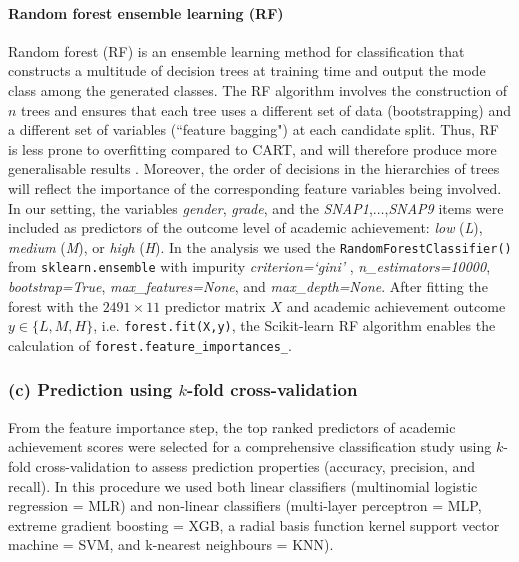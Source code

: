 \documentclass[10pt,letterpaper]{article}
\begin{document}
{{\paragraph{Random forest ensemble learning (RF)}
Random forest (RF) is an ensemble learning method for classification that constructs a multitude of decision trees at training time and output the mode class among 
the generated classes. The RF algorithm involves the construction of $n$ trees and ensures that each tree uses a different set of data (bootstrapping) 
and a different set of variables (``feature bagging") at each candidate split. 
Thus, RF is less prone to overfitting compared to CART, and will therefore produce more generalisable results \cite{Breiman2001}.  
Moreover, the order of decisions in the hierarchies of trees will reflect the importance of the corresponding feature variables being involved. In our setting,
the variables {\it gender}, {\it grade}, and the {\it SNAP1},$\ldots$,{\it SNAP9} items were included as predictors of the outcome level of academic achievement:
{\it low} ({\it L}), {\it medium} ({\it M}), or {\it high} ({\it H}).
In the analysis we used the {\tt \small RandomForestClassifier()}  from {\tt \small sklearn.ensemble} with impurity {\it criterion=`gini'} ,
{\it n\_estimators=10000}, {\it bootstrap=True}, {\it max\_features=None}, and {\it max\_depth=None}. 
After fitting the forest with the $2491 \times 11$ predictor matrix $X$ and academic achievement outcome $y \in \{L, M, H\} $, i.e. {\tt \small forest.fit(X,y)}, the 
Scikit-learn RF algorithm enables the calculation of {\tt \small forest.feature\_importances\_}.



\subsubsection*{(c) Prediction using $k$-fold cross-validation}

From the feature importance step, the top ranked predictors of academic achievement scores were 
selected for a comprehensive classification study using $k$-fold cross-validation to assess prediction properties (accuracy, precision, and recall). 
In this procedure we used both linear classifiers (multinomial logistic regression = MLR) and non-linear classifiers 
(multi-layer perceptron = MLP,  extreme gradient boosting = XGB, a radial basis function kernel support vector machine = SVM, and k-nearest neighbours  =
KNN). 

}}
\end{document}
